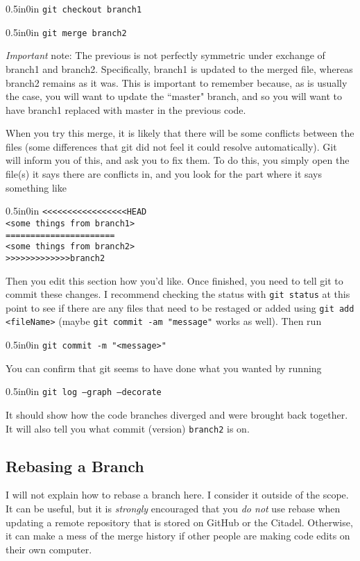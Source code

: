 \documentclass[11pt]{article}
\newcommand{\code}[1]{\begin{adjustwidth}{0.5in}{0in}
    \texttt{#1}
    \end{adjustwidth}}
\begin{document}
\code{git checkout branch1}
\code{git merge branch2}

\emph{Important} note: The previous is not perfectly symmetric under exchange of branch1 and branch2.  Specifically, branch1 is updated to the merged file, whereas branch2 remains as it was.  This is important to remember because, as is usually the case, you will want to update the ``master" branch, and so you will want to have branch1 replaced with master in the previous code.

When you try this merge, it is likely that there will be some conflicts between the files (some differences that git did not feel it could resolve automatically).  Git will inform you of this, and ask you to fix them.  To do this, you simply open the file(s) it says there are conflicts in, and you look for the part where it says something like

\code{<<<<<<<<<<<<<<<<<HEAD\\
<some things from branch1>\\
======================\\
<some things from branch2>\\
>>>>>>>>>>>>>branch2}

Then you edit this section how you'd like.  Once finished, you need to tell git to commit these changes.  I recommend checking the status with \texttt{git status} at this point to see if there are any files that need to be restaged or added using \texttt{git add <fileName>} (maybe \texttt{git commit -am "message"} works as well).  Then run

\code{git commit -m "<message>"}

You can confirm that git seems to have done what you wanted by running 

\code{git log --graph --decorate}

It should show how the code branches diverged and were brought back together.  It will also tell you what commit (version) \texttt{branch2} is on.

\subsection{Rebasing a Branch}

I will not explain how to rebase a branch here.  I consider it outside of the scope.  It can be useful, but it is \emph{strongly} encouraged that you \emph{do not} use rebase when updating a remote repository that is stored on GitHub or the Citadel.  Otherwise, it can make a mess of the merge history if other people are making code edits on their own computer.
\end{document}
